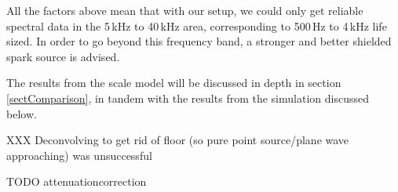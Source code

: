 All the factors above mean that with our setup, we could only get reliable spectral data in the 5\,kHz to 40\,kHz area, corresponding to 500\,Hz to 4\,kHz life sized. In order to go beyond this frequency band, a stronger and better shielded spark source is advised.

The results from the scale model will be discussed in depth in section \ref{sectComparison}, in tandem with the results from the simulation discussed below.


XXX Deconvolving to get rid of floor (so pure point source/plane wave approaching) was unsuccessful


TODO attenuationcorrection


